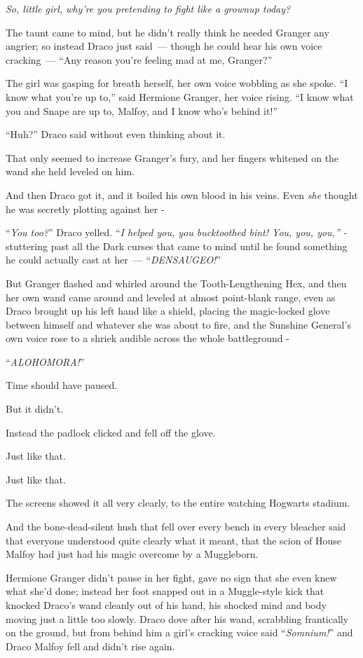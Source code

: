 \emph{So, little girl, why're you pretending to fight like a grownup today?}

The taunt came to mind, but he didn't really think he needed Granger any angrier; so instead Draco just said~--- though he could hear his own voice cracking~--- ``Any reason you're feeling mad at me, Granger?''

The girl was gasping for breath herself, her own voice wobbling as she spoke. ``I know what you're up to,'' said Hermione Granger, her voice rising. ``I know what you and Snape are up to, Malfoy, and I know who's behind it!''

``Huh?'' Draco said without even thinking about it.

That only seemed to increase Granger's fury, and her fingers whitened on the wand she held leveled on him.

And then Draco got it, and it boiled his own blood in his veins. Even \emph{she} thought he was secretly plotting against her -

``\emph{You too?}'' Draco yelled. ``\emph{I helped you, you bucktoothed bint! You, you, you,'' -} stuttering past all the Dark curses that came to mind until he found something he could actually cast at her~--- ``\emph{DENSAUGEO!}''

But Granger flashed and whirled around the Tooth-Lengthening Hex, and then her own wand came around and leveled at almost point-blank range, even as Draco brought up his left hand like a shield, placing the magic-locked glove between himself and whatever she was about to fire, and the Sunshine General's own voice rose to a shriek audible across the whole battleground -

``\emph{ALOHOMORA!}''

Time should have paused.

But it didn't.

Instead the padlock clicked and fell off the glove.

Just like that.

Just like that.

The screens showed it all very clearly, to the entire watching Hogwarts stadium.

And the bone-dead-silent hush that fell over every bench in every bleacher said that everyone understood quite clearly what it meant, that the scion of House Malfoy had just had his magic overcome by a Muggleborn.

Hermione Granger didn't pause in her fight, gave no sign that she even knew what she'd done; instead her foot snapped out in a Muggle-style kick that knocked Draco's wand cleanly out of his hand, his shocked mind and body moving just a little too slowly. Draco dove after his wand, scrabbling frantically on the ground, but from behind him a girl's cracking voice said ``\emph{Somnium!}'' and Draco Malfoy fell and didn't rise again.

